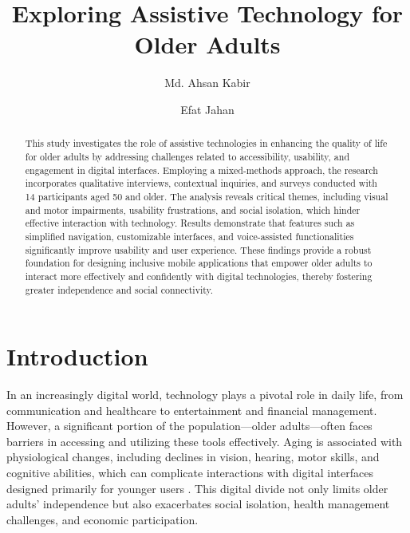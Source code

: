 \documentclass[acmlarge]{acmart}
\begin{document}
\title{Exploring Assistive Technology for Older Adults}

\author{Md. Ahsan Kabir}
\author{Efat Jahan}
\authornotemark[1]

\renewcommand{\shortauthors}{Kabir and Jahan}

\begin{abstract}
This study investigates the role of assistive technologies in enhancing the quality of life for older adults by addressing challenges related to accessibility, usability, and engagement in digital interfaces. Employing a mixed-methods approach, the research incorporates qualitative interviews, contextual inquiries, and surveys conducted with 14 participants aged 50 and older. The analysis reveals critical themes, including visual and motor impairments, usability frustrations, and social isolation, which hinder effective interaction with technology. Results demonstrate that features such as simplified navigation, customizable interfaces, and voice-assisted functionalities significantly improve usability and user experience. These findings provide a robust foundation for designing inclusive mobile applications that empower older adults to interact more effectively and confidently with digital technologies, thereby fostering greater independence and social connectivity.
\end{abstract}


\maketitle

\section{Introduction}
In an increasingly digital world, technology plays a pivotal role in daily life, from communication and healthcare to entertainment and financial management. However, a significant portion of the population—older adults—often faces barriers in accessing and utilizing these tools effectively. Aging is associated with physiological changes, including declines in vision, hearing, motor skills, and cognitive abilities, which can complicate interactions with digital interfaces designed primarily for younger users \cite{smith2021elderlytech, anderson2019agingtech, barnard2018digitaldivide}. This digital divide not only limits older adults' independence but also exacerbates social isolation, health management challenges, and economic participation.
\end{document}
